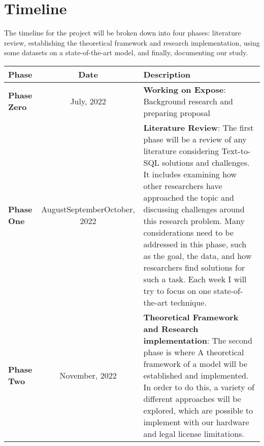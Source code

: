 
\newpage
\section{Timeline}

The timeline for the project will be broken down into four phases: literature review, establishing the theoretical framework and research implementation, using some datasets on a state-of-the-art model, and finally, documenting our study.

\begin{tabular}{|l|c|p{9.5cm}|}
    \hline
    Phase                & Date                                                                                & Description                                                                                                                                                                                                                                                                                                                                                                                                                                                             \\
    \hline
    \textbf{Phase Zero}  & July, 2022                                                                          & \textbf{Working on Expose}: Background research and preparing proposal                                                                                                                                                                                                                                                                                                                                                                                                  \\
    \hline
    \textbf{Phase One}   & \multicolumn{1}{p{3cm}|}{\centering August\newline September\newline October, 2022} & \textbf{Literature Review}: The first phase will be a review of any literature considering Text-to-SQL solutions and challenges. It includes examining how other researchers have approached the topic and discussing challenges around this research problem. Many considerations need to be addressed in this phase, such as the goal, the data, and how researchers find solutions for such a task. Each week I will try to focus on one state-of-the-art technique. \\
    \hline
    \textbf{Phase Two}   & November, 2022                                                                      & \textbf{Theoretical Framework and Research implementation}: The second phase is where A theoretical framework of a model will be established and implemented. In order to do this, a variety of different approaches will be explored, which are possible to implement with our hardware and legal license limitations.                                                                                                                                                 \\

\end{tabular}
